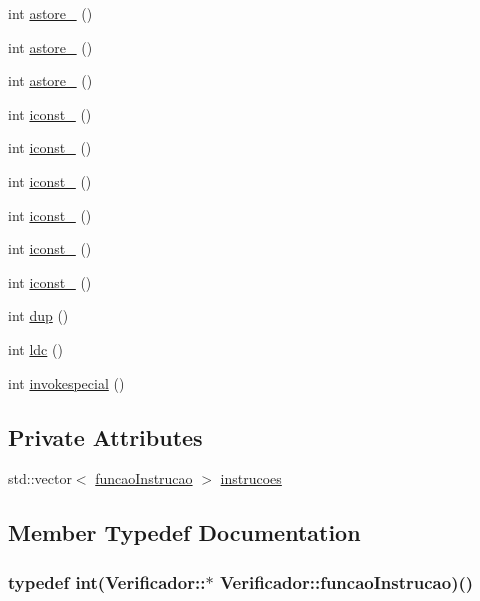 \begin{DoxyCompactItemize}
int \hyperlink{classVerificador_af4f04c7e7c4d10792fa4006e09e4e6a9}{astore\+\_} ()
\item 
int \hyperlink{classVerificador_a47b59c3ef835fa61de878013a96d6f90}{astore\+\_} ()
\item 
int \hyperlink{classVerificador_af5c7c091ff6533f4a3895f889fd292ca}{astore\+\_} ()
\item 
int \hyperlink{classVerificador_ae6ddd2604943570bb21aad6b1f7b4b0d}{iconst\+\_} ()
\item 
int \hyperlink{classVerificador_a7afc5ad8d65b0cf65ea1019f2f27377d}{iconst\+\_} ()
\item 
int \hyperlink{classVerificador_a41d3ffc0c4844d826a90dcb504f8c01f}{iconst\+\_} ()
\item 
int \hyperlink{classVerificador_a93937f29a122eac18e14a7fdd1dba7a6}{iconst\+\_} ()
\item 
int \hyperlink{classVerificador_a1ec75b8ffee7f0e8695746f383822dd8}{iconst\+\_} ()
\item 
int \hyperlink{classVerificador_afde3639a904bb7cea0801670e5c49088}{iconst\+\_} ()
\item 
int \hyperlink{classVerificador_aeca4a45fdd5405f28ffe5d5e0770b2ab}{dup} ()
\item 
int \hyperlink{classVerificador_a300fe66b804f4253d90cf9a04da72540}{ldc} ()
\item 
int \hyperlink{classVerificador_add384ff8a5fb6c71fee4c7cb74b5cc1b}{invokespecial} ()
\end{DoxyCompactItemize}
\subsection*{Private Attributes}
\begin{DoxyCompactItemize}
\item 
std\+::vector$<$ \hyperlink{classVerificador_a2a64056e6634e64f586f2788b5685e5c}{funcao\+Instrucao} $>$ \hyperlink{classVerificador_a54353413a8f54a75a66cbd25f1b0624c}{instrucoes}
\end{DoxyCompactItemize}


\subsection{Member Typedef Documentation}
\hypertarget{classVerificador_a2a64056e6634e64f586f2788b5685e5c}{
\subsubsection[{funcao\+Instrucao}]{\setlength{\rightskip}{0pt plus 5cm}typedef int(Verificador\+::$\ast$ Verificador\+::funcao\+Instrucao)()\hspace{0.3cm}{\ttfamily [private]}}}\label{classVerificador_a2a64056e6634e64f586f2788b5685e5c}


